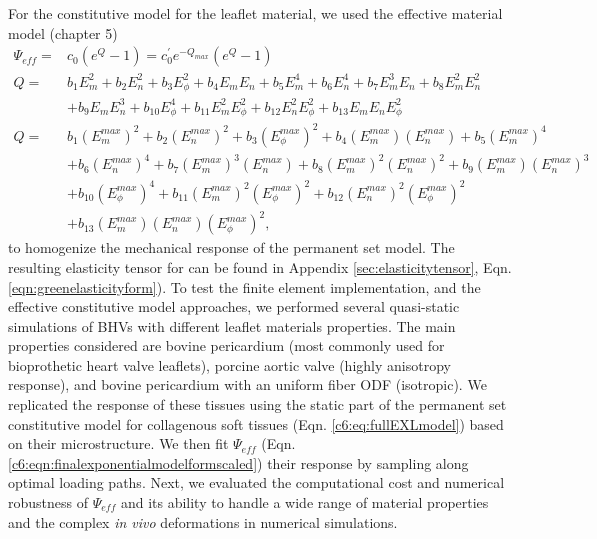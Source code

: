 	
	For the constitutive model for the leaflet material, we used the effective material model (chapter 5)
\begin{equation} \label{c6:eqn:finalexponentialmodelformscaled}
\begin{aligned}
\Psi_{eff} 	=& c_0 \left(e^{Q} - 1\right) = c_0^\prime e^{-Q_{max}}\left(e^{Q} - 1\right)    \\
Q		=& b_1 E_m^2 + b_2 E_n^2 + b_3 E_\phi^2 + b_4 E_m E_n + b_5 E_m^4 + b_6 E_n^4 + b_7 E_m^3 E_n + b_8 E_m^2 E_n^2 \\ 
&+ b_9 E_m E_n^3 + b_{10} E_\phi^4 + b_{11} E_m^2E_\phi^2 + b_{12} E_n^2 E_\phi^2 + b_{13} E_m E_n E_\phi^2 \\
Q		=& b_1 (E_m^{max})^2 + b_2 (E_n^{max})^2 + b_3 (E_\phi^{max})^2 + b_4 (E_m^{max}) (E_n^{max}) + b_5 (E_m^{max})^4   \\
    &+ b_6 (E_n^{max})^4 + b_7 (E_m^{max})^3 (E_n^{max}) + b_8 (E_m^{max})^2 (E_n^{max})^2 + b_9 (E_m^{max}) (E_n^{max})^3	\\
	&+ b_{10} (E_\phi^{max})^4 + b_{11} (E_m^{max})^2(E_\phi^{max})^2 + b_{12} (E_n^{max})^2 (E_\phi^{max})^2    \\ 
	&+ b_{13} (E_m^{max}) (E_n^{max}) (E_\phi^{max})^2,
\end{aligned}
\end{equation}
	to homogenize the mechanical response of the permanent set model. The resulting elasticity tensor for can be found in Appendix \ref{sec:elasticitytensor}, Eqn. \ref{eqn:greenelasticityform}). To test the finite element implementation, and the effective constitutive model approaches, we performed several quasi-static simulations of BHVs with different leaflet materials properties. The main properties considered are bovine pericardium (most commonly used for bioprothetic heart valve leaflets), porcine aortic valve (highly anisotropy response), and bovine pericardium with an uniform fiber ODF (isotropic). We replicated the response of these tissues using the static part of the permanent set constitutive model for collagenous soft tissues (Eqn. \ref{c6:eq:fullEXLmodel}) based on their microstructure. We then fit $\Psi_{eff}$ (Eqn. \ref{c6:eqn:finalexponentialmodelformscaled}) their response by sampling along optimal loading paths. Next, we evaluated the computational cost and numerical robustness of $\Psi_{eff}$ and its ability to handle a wide range of material properties and the complex \textit{in vivo} deformations in numerical simulations.
    

